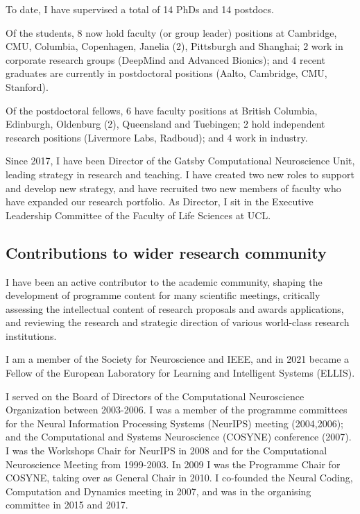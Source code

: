 {To date, I have supervised a total of 14 PhDs and 14 postdocs.

Of the students, 8 now hold faculty (or group leader) positions at
Cambridge, CMU, Columbia, Copenhagen, Janelia (2), Pittsburgh and
Shanghai; 2 work in corporate research groups (DeepMind and Advanced
Bionics); and 4 recent graduates are currently in postdoctoral
positions (Aalto, Cambridge, CMU, Stanford).

Of the postdoctoral fellows, 6 have faculty positions at British
Columbia, Edinburgh, Oldenburg (2), Queensland and Tuebingen; 2 hold
independent research positions (Livermore Labs, Radboud); and 4 work
in industry.

Since 2017, I have been Director of the Gatsby Computational
Neuroscience Unit, leading strategy in research and teaching.  I have
created two new roles to support and develop new strategy, and have
recruited two new members of faculty who have expanded our research
portfolio. As Director, I sit in the Executive Leadership Committee of
the Faculty of Life Sciences at UCL.
 

% 

\subsection{Contributions to wider research community}

I have been an active contributor to the academic community, shaping
the development of programme content for many scientific meetings,
critically assessing the intellectual content of research proposals
and awards applications, and reviewing the research and strategic
direction of various world-class research institutions.

I am a member of the Society for Neuroscience and IEEE, and in 2021
became a Fellow of the European Laboratory for Learning and
Intelligent Systems (ELLIS).

I served on the Board of Directors of the Computational Neuroscience
Organization between 2003-2006.
%
I was a member of the programme committees for 
%
the Neural Information Processing Systems (NeurIPS) meeting
(2004,2006); and the Computational and Systems Neuroscience (COSYNE)
conference (2007).
%
I was the Workshops Chair for NeurIPS in 2008 and for the Computational
Neuroscience Meeting from 1999-2003.
%
In 2009 I was the Programme Chair for COSYNE, taking over as General
Chair in  2010.
%
I co-founded the Neural Coding, Computation and Dynamics meeting in
2007, and was in the organising committee in 2015 and 2017.

}

